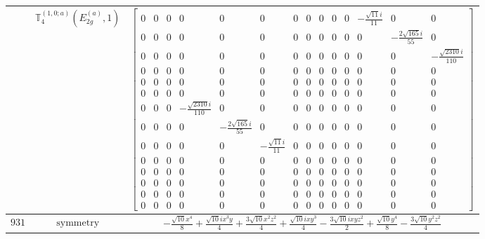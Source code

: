 \documentclass[fleqn,8pt,landscape]{jsarticle}
\begin{document}
\begin{longtable}{ccc}
$  $ & $ \mathbb{T}_{4}^{(1,0;a)}(E_{2g}^{(a)},1) $ & $ \begin{bmatrix} 0 & 0 & 0 & 0 & 0 & 0 & 0 & 0 & 0 & 0 & 0 & - \frac{\sqrt{11} i}{11} & 0 & 0 \\ 0 & 0 & 0 & 0 & 0 & 0 & 0 & 0 & 0 & 0 & 0 & 0 & - \frac{2 \sqrt{165} i}{55} & 0 \\ 0 & 0 & 0 & 0 & 0 & 0 & 0 & 0 & 0 & 0 & 0 & 0 & 0 & - \frac{\sqrt{2310} i}{110} \\ 0 & 0 & 0 & 0 & 0 & 0 & 0 & 0 & 0 & 0 & 0 & 0 & 0 & 0 \\ 0 & 0 & 0 & 0 & 0 & 0 & 0 & 0 & 0 & 0 & 0 & 0 & 0 & 0 \\ 0 & 0 & 0 & 0 & 0 & 0 & 0 & 0 & 0 & 0 & 0 & 0 & 0 & 0 \\ 0 & 0 & 0 & - \frac{\sqrt{2310} i}{110} & 0 & 0 & 0 & 0 & 0 & 0 & 0 & 0 & 0 & 0 \\ 0 & 0 & 0 & 0 & - \frac{2 \sqrt{165} i}{55} & 0 & 0 & 0 & 0 & 0 & 0 & 0 & 0 & 0 \\ 0 & 0 & 0 & 0 & 0 & - \frac{\sqrt{11} i}{11} & 0 & 0 & 0 & 0 & 0 & 0 & 0 & 0 \\ 0 & 0 & 0 & 0 & 0 & 0 & 0 & 0 & 0 & 0 & 0 & 0 & 0 & 0 \\ 0 & 0 & 0 & 0 & 0 & 0 & 0 & 0 & 0 & 0 & 0 & 0 & 0 & 0 \\ 0 & 0 & 0 & 0 & 0 & 0 & 0 & 0 & 0 & 0 & 0 & 0 & 0 & 0 \\ 0 & 0 & 0 & 0 & 0 & 0 & 0 & 0 & 0 & 0 & 0 & 0 & 0 & 0 \\ 0 & 0 & 0 & 0 & 0 & 0 & 0 & 0 & 0 & 0 & 0 & 0 & 0 & 0 \end{bmatrix} $ \\ \hline
$ 931 $ & $ \text{symmetry} $ & $ - \frac{\sqrt{10} x^{4}}{8} + \frac{\sqrt{10} i x^{3} y}{4} + \frac{3 \sqrt{10} x^{2} z^{2}}{4} + \frac{\sqrt{10} i x y^{3}}{4} - \frac{3 \sqrt{10} i x y z^{2}}{2} + \frac{\sqrt{10} y^{4}}{8} - \frac{3 \sqrt{10} y^{2} z^{2}}{4} $ \\

\end{longtable}
\end{document}
